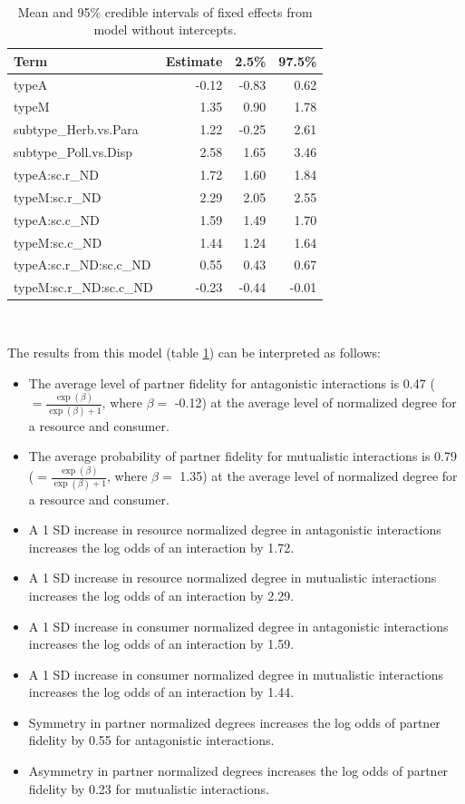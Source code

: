 \documentclass[11pt,]{article}
\begin{document}
~

\begin{table}[!h]

\caption{\label{tab:no-intercept-table}Mean and 95\% credible intervals of fixed effects from model without intercepts.}
\centering
\begin{tabular}{lrrr}
\toprule
Term & Estimate & 2.5\% & 97.5\%\\
\midrule
\rowcolor{gray!6}  typeA & -0.12 & -0.83 & 0.62\\
typeM & 1.35 & 0.90 & 1.78\\
\rowcolor{gray!6}  subtype\_Herb.vs.Para & 1.22 & -0.25 & 2.61\\
subtype\_Poll.vs.Disp & 2.58 & 1.65 & 3.46\\
\rowcolor{gray!6}  typeA:sc.r\_ND & 1.72 & 1.60 & 1.84\\
typeM:sc.r\_ND & 2.29 & 2.05 & 2.55\\
\rowcolor{gray!6}  typeA:sc.c\_ND & 1.59 & 1.49 & 1.70\\
typeM:sc.c\_ND & 1.44 & 1.24 & 1.64\\
\rowcolor{gray!6}  typeA:sc.r\_ND:sc.c\_ND & 0.55 & 0.43 & 0.67\\
typeM:sc.r\_ND:sc.c\_ND & -0.23 & -0.44 & -0.01\\
\bottomrule
\end{tabular}
\end{table}

~

The results from this model (table \ref{tab:no-intercept-table}) can be
interpreted as follows:

\begin{itemize}
\item
  The average level of partner fidelity for antagonistic interactions is
  0.47 (\(=\frac{\exp(\beta)}{\exp(\beta)+1}\), where \(\beta=\) -0.12)
  at the average level of normalized degree for a resource and consumer.
\item
  The average probability of partner fidelity for mutualistic
  interactions is 0.79 (\(=\frac{\exp(\beta)}{\exp(\beta)+1}\), where
  \(\beta=\) 1.35) at the average level of normalized degree for a
  resource and consumer.
\item
  A 1 SD increase in resource normalized degree in antagonistic
  interactions increases the log odds of an interaction by 1.72.
\item
  A 1 SD increase in resource normalized degree in mutualistic
  interactions increases the log odds of an interaction by 2.29.
\item
  A 1 SD increase in consumer normalized degree in antagonistic
  interactions increases the log odds of an interaction by 1.59.
\item
  A 1 SD increase in consumer normalized degree in mutualistic
  interactions increases the log odds of an interaction by 1.44.
\item
  Symmetry in partner normalized degrees increases the log odds of
  partner fidelity by 0.55 for antagonistic interactions.
\item
  Asymmetry in partner normalized degrees increases the log odds of
  partner fidelity by 0.23 for mutualistic interactions.
\end{itemize}
\end{document}
